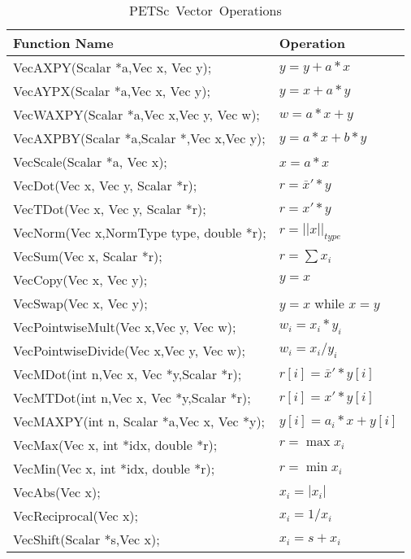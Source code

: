 \begin{table}[tb]
\begin{center}
\begin{tabular}{ll}
{\bf Function Name} & {\bf Operation} \\
\hline
VecAXPY(Scalar *a,Vec x, Vec y); & $ y = y + a*x$ \\
VecAYPX(Scalar *a,Vec x, Vec y); & $ y = x + a*y$ \\
VecWAXPY(Scalar *a,Vec x,Vec y, Vec w); & $ w = a*x + y$ \\
VecAXPBY(Scalar *a,Scalar *,Vec x,Vec y); & $ y = a*x + b*y$ \\
VecScale(Scalar *a, Vec x); & $ x = a*x $ \\
VecDot(Vec x, Vec y, Scalar *r); & $ r = \bar{x}'*y$ \\
VecTDot(Vec x, Vec y, Scalar *r); & $ r = x'*y$ \\
VecNorm(Vec x,NormType type,  double *r); & $ r = ||x||_{type}$ \\
VecSum(Vec x,   Scalar *r); & $ r = \sum x_{i}$ \\
VecCopy(Vec x, Vec y); & $ y = x $ \\
VecSwap(Vec x, Vec y); & $ y = x $ while $ x = y$ \\
VecPointwiseMult(Vec x,Vec y, Vec w); & $ w_{i} = x_{i}*y_{i} $ \\
VecPointwiseDivide(Vec x,Vec y, Vec w); & $ w_{i} = x_{i}/y_{i} $ \\
VecMDot(int n,Vec x, Vec *y,Scalar *r); & $ r[i] = \bar{x}'*y[i]$ \\
VecMTDot(int n,Vec x, Vec *y,Scalar *r); & $ r[i] = x'*y[i]$ \\
VecMAXPY(int n, Scalar *a,Vec x, Vec *y); \hspace{1cm} & $ y[i] = a_{i}*x + y[i] $ \\
VecMax(Vec x,  int *idx, double *r); & $ r = \max x_{i}$ \\
VecMin(Vec x,  int *idx, double *r); & $ r = \min x_{i}$ \\
VecAbs(Vec x); & $ x_i = |x_{i}|$ \\
VecReciprocal(Vec x); & $ x_i = 1/x_{i}$ \\
VecShift(Scalar *s,Vec x); & $ x_i = s + x_{i}$ \\
\hline 
\end{tabular}
\end{center}
\caption{\hbox{PETSc Vector Operations}}
\label{fig:vectorops}
\end{table}

